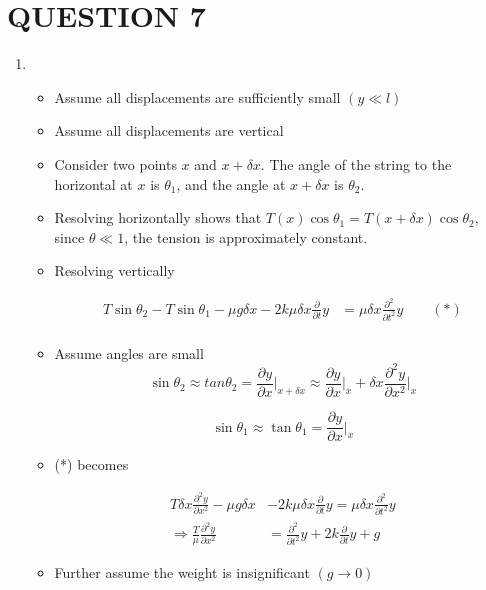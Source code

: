 \documentclass[a4paper]{article}
\begin{document}
\section{QUESTION 7}


\begin{enumerate}
	\item \begin{itemize}
		\item Assume all displacements are sufficiently small $ ( y \ll l) $
		\item Assume all displacements are vertical
		\item Consider two points $ x $ and $ x + \delta x $. The angle of the string to the horizontal at $ x $ is $ \theta_{1} $, and the angle at $ x + \delta x $ is $ \theta_{2} $.
		\item Resolving horizontally shows that $ T(x)\cos \theta_{1} = T(x + \delta x) \cos \theta_{2} $, since $ \theta \ll 1 $, the tension is approximately constant.
		\item Resolving vertically 
		
		\begin{align*}
		T \sin \theta_{2} -  T \sin \theta_{1} - \mu g \delta x - 2k \mu \delta x \frac{\partial  }{\partial t}y  & = \mu \delta x \frac{\partial^{2} }{\partial t^{2}} y   \qquad (*) \\
		\end{align*} 
		
		
		\item Assume angles are small
		\[ \sin \theta_{2} \approx tan \theta_{2} =  \frac{\partial y }{\partial x} \Big|_{x + \delta x} \approx \frac{\partial y }{\partial x} \Big|_{x} + \delta x \frac{\partial^{2} y }{\partial x^{2}} \Big|_{x}   \]
		
		\[ \sin \theta_{1} \approx \tan \theta_{1} = \frac{\partial y }{\partial x} \Big|_{x} \]
	
		\item (*) becomes 
		
		\begin{align*}
		T \delta x \frac{\partial^{2} y }{\partial x^{2}}   - \mu g \delta x & - 2k \mu \delta x \frac{\partial  }{\partial t}y   = \mu \delta x \frac{\partial^{2} }{\partial t^{2}} y   \\
		\Rightarrow \frac{T}{\mu} \frac{\partial^{2} y }{\partial x^{2}}  & = \frac{\partial^{2} }{\partial t^{2}} y +  2k \frac{\partial  }{\partial t}y + g
		\end{align*} 
		
		\item Further assume the weight is insignificant $ (g \to 0) $
		

\end{itemize}
\end{enumerate}
\end{document}
